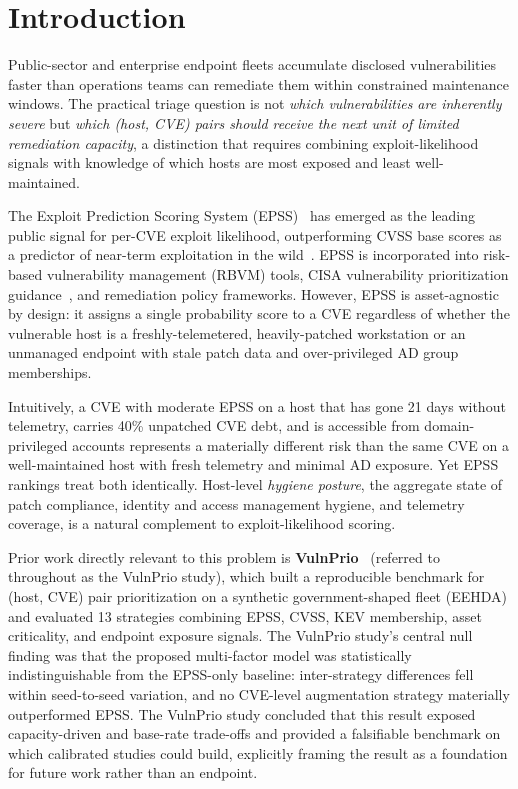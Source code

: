 \section{Introduction}

Public-sector and enterprise endpoint fleets accumulate disclosed vulnerabilities faster than operations teams can remediate them within constrained maintenance windows. The practical triage question is not \emph{which vulnerabilities are inherently severe} but \emph{which (host, CVE) pairs should receive the next unit of limited remediation capacity}, a distinction that requires combining exploit-likelihood signals with knowledge of which hosts are most exposed and least well-maintained.

The Exploit Prediction Scoring System (EPSS)~\cite{jacobs2021epss} has emerged as the leading public signal for per-CVE exploit likelihood, outperforming CVSS base scores as a predictor of near-term exploitation in the wild~\cite{jacobs2020improving}. EPSS is incorporated into risk-based vulnerability management (RBVM) tools, CISA vulnerability prioritization guidance~\cite{cisa2021bod2201,cisa2022bod2301}, and remediation policy frameworks. However, EPSS is asset-agnostic by design: it assigns a single probability score to a CVE regardless of whether the vulnerable host is a freshly-telemetered, heavily-patched workstation or an unmanaged endpoint with stale patch data and over-privileged AD group memberships.

Intuitively, a CVE with moderate EPSS on a host that has gone 21 days without telemetry, carries 40\% unpatched CVE debt, and is accessible from domain-privileged accounts represents a materially different risk than the same CVE on a well-maintained host with fresh telemetry and minimal AD exposure. Yet EPSS rankings treat both identically. Host-level \emph{hygiene posture}, the aggregate state of patch compliance, identity and access management hygiene, and telemetry coverage, is a natural complement to exploit-likelihood scoring.

Prior work directly relevant to this problem is \textbf{VulnPrio}~\cite{paper1vulnprio} (referred to throughout as the VulnPrio study), which built a reproducible benchmark for (host, CVE) pair prioritization on a synthetic government-shaped fleet (EEHDA) and evaluated 13 strategies combining EPSS, CVSS, KEV membership, asset criticality, and endpoint exposure signals. The VulnPrio study's central null finding was that the proposed multi-factor model was statistically indistinguishable from the EPSS-only baseline: inter-strategy differences fell within seed-to-seed variation, and no CVE-level augmentation strategy materially outperformed EPSS. The VulnPrio study concluded that this result exposed capacity-driven and base-rate trade-offs and provided a falsifiable benchmark on which calibrated studies could build, explicitly framing the result as a foundation for future work rather than an endpoint.

